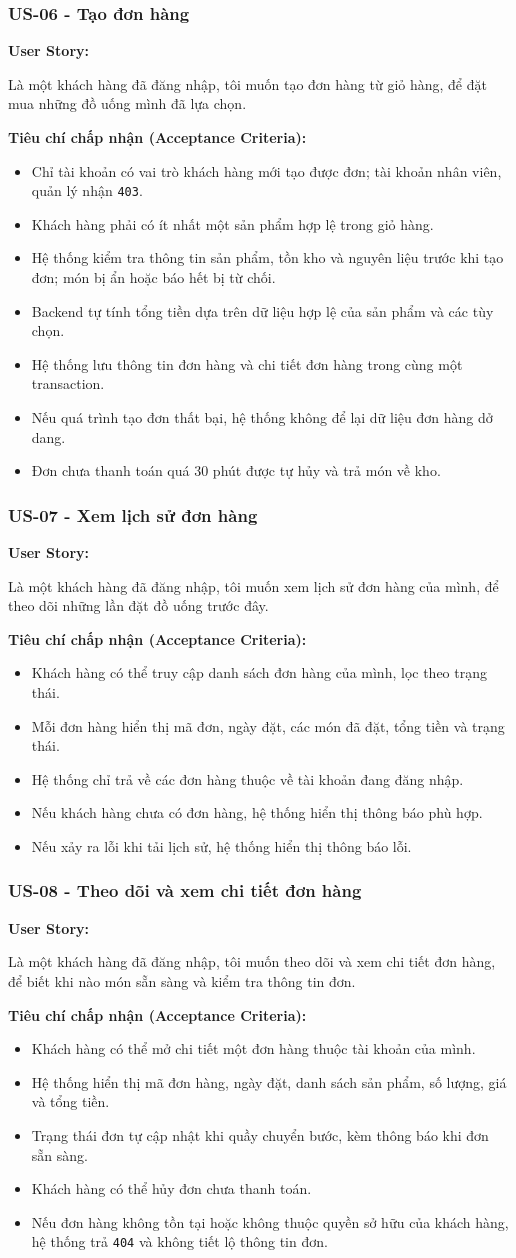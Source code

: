 \documentclass[12pt,a4paper]{article}
\newcommand{\userstory}[2]{%
  \noindent\textbf{User Story:}\par
  #1\par
  \hspace*{\parindent}\textbf{Tiêu chí chấp nhận (Acceptance Criteria):}
  \begin{itemize}
    #2
  \end{itemize}}
\begin{document}
\subsubsection{US-06 - Tạo đơn hàng}
\userstory{Là một khách hàng đã đăng nhập, tôi muốn tạo đơn hàng từ giỏ hàng, để đặt mua những đồ uống mình đã lựa chọn.}{
  \item Chỉ tài khoản có vai trò khách hàng mới tạo được đơn; tài khoản nhân viên, quản lý nhận \texttt{403}.
  \item Khách hàng phải có ít nhất một sản phẩm hợp lệ trong giỏ hàng.
  \item Hệ thống kiểm tra thông tin sản phẩm, tồn kho và nguyên liệu trước khi tạo đơn; món bị ẩn hoặc báo hết bị từ chối.
  \item Backend tự tính tổng tiền dựa trên dữ liệu hợp lệ của sản phẩm và các tùy chọn.
  \item Hệ thống lưu thông tin đơn hàng và chi tiết đơn hàng trong cùng một transaction.
  \item Nếu quá trình tạo đơn thất bại, hệ thống không để lại dữ liệu đơn hàng dở dang.
  \item Đơn chưa thanh toán quá 30 phút được tự hủy và trả món về kho.
}

\subsubsection{US-07 - Xem lịch sử đơn hàng}
\userstory{Là một khách hàng đã đăng nhập, tôi muốn xem lịch sử đơn hàng của mình, để theo dõi những lần đặt đồ uống trước đây.}{
  \item Khách hàng có thể truy cập danh sách đơn hàng của mình, lọc theo trạng thái.
  \item Mỗi đơn hàng hiển thị mã đơn, ngày đặt, các món đã đặt, tổng tiền và trạng thái.
  \item Hệ thống chỉ trả về các đơn hàng thuộc về tài khoản đang đăng nhập.
  \item Nếu khách hàng chưa có đơn hàng, hệ thống hiển thị thông báo phù hợp.
  \item Nếu xảy ra lỗi khi tải lịch sử, hệ thống hiển thị thông báo lỗi.
}

\subsubsection{US-08 - Theo dõi và xem chi tiết đơn hàng}
\userstory{Là một khách hàng đã đăng nhập, tôi muốn theo dõi và xem chi tiết đơn hàng, để biết khi nào món sẵn sàng và kiểm tra thông tin đơn.}{
  \item Khách hàng có thể mở chi tiết một đơn hàng thuộc tài khoản của mình.
  \item Hệ thống hiển thị mã đơn hàng, ngày đặt, danh sách sản phẩm, số lượng, giá và tổng tiền.
  \item Trạng thái đơn tự cập nhật khi quầy chuyển bước, kèm thông báo khi đơn sẵn sàng.
  \item Khách hàng có thể hủy đơn chưa thanh toán.
  \item Nếu đơn hàng không tồn tại hoặc không thuộc quyền sở hữu của khách hàng, hệ thống trả \texttt{404} và không tiết lộ thông tin đơn.
}
\end{document}
